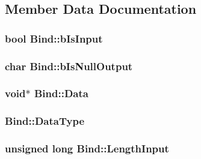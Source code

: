 \subsection{Member Data Documentation}
\hypertarget{class_bind_a0b7f3a32f4168bea439c6f253c60dfe7}{}
\subsubsection[{b\+Is\+Input}]{\setlength{\rightskip}{0pt plus 5cm}bool Bind\+::b\+Is\+Input\hspace{0.3cm}{\ttfamily [protected]}}\label{class_bind_a0b7f3a32f4168bea439c6f253c60dfe7}
\hypertarget{class_bind_ab550a5976b3cc873d3cc38e70466e3d9}{}
\subsubsection[{b\+Is\+Null\+Output}]{\setlength{\rightskip}{0pt plus 5cm}char Bind\+::b\+Is\+Null\+Output\hspace{0.3cm}{\ttfamily [protected]}}\label{class_bind_ab550a5976b3cc873d3cc38e70466e3d9}
\hypertarget{class_bind_a7d807b74fa3ceb651605e24050b5a268}{}
\subsubsection[{Data}]{\setlength{\rightskip}{0pt plus 5cm}void$\ast$ Bind\+::\+Data\hspace{0.3cm}{\ttfamily [protected]}}\label{class_bind_a7d807b74fa3ceb651605e24050b5a268}
\hypertarget{class_bind_af56079d7e7b1d85c87bd00f66d997fdf}{}
\subsubsection[{Data\+Type}]{ Bind\+::\+Data\+Type\hspace{0.3cm}{\ttfamily [protected]}}\label{class_bind_af56079d7e7b1d85c87bd00f66d997fdf}
\hypertarget{class_bind_a4f93640ee287565657a0c646ba541449}{}
\subsubsection[{Length\+Input}]{\setlength{\rightskip}{0pt plus 5cm}unsigned long Bind\+::\+Length\+Input\hspace{0.3cm}{\ttfamily [protected]}}\label{class_bind_a4f93640ee287565657a0c646ba541449}
\hypertarget{class_bind_aa47b0ebce3918a7a3d82c7aac91baa54}{}
